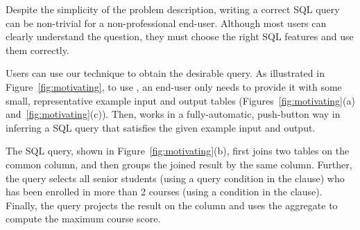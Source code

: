 Despite the simplicity of the problem description,
writing a correct SQL query  can be non-trivial for a non-professional
end-user.
Although most users can clearly understand the
question, they must choose the right SQL
features and use them correctly.

Users can use our \ourtool technique to obtain
the desirable query.
As illustrated in Figure~\ref{fig:motivating},
to use \ourtool, an end-user only needs to provide it with
some small, representative example input and output tables
(Figures~\ref{fig:motivating}(a) and~\ref{fig:motivating}(c)).
Then, \ourtool works in a fully-automatic, push-button
way in inferring a SQL query that satisfies the given
example input and output.


The SQL query, shown in Figure~\ref{fig:motivating}(b),
first joins two tables on the common  column,
and then groups the joined result by the same 
column. Further, the query selects all senior
students  (using a query condition in the 
clause) who has been enrolled in more than 2 courses
(using a condition in the  clause).
Finally, the query projects the result on the
 column and uses the  aggregate
to compute the maximum course score.







